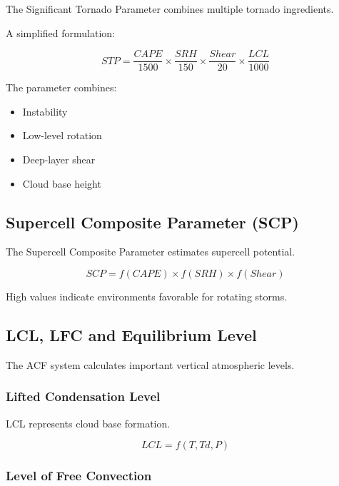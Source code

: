 The Significant Tornado Parameter combines multiple tornado ingredients.

A simplified formulation:

\[
STP=
\frac{CAPE}{1500}
\times
\frac{SRH}{150}
\times
\frac{Shear}{20}
\times
\frac{LCL}{1000}
\]

The parameter combines:

\begin{itemize}

\item Instability

\item Low-level rotation

\item Deep-layer shear

\item Cloud base height

\end{itemize}


\subsection{Supercell Composite Parameter (SCP)}

The Supercell Composite Parameter estimates supercell potential.

\[
SCP=
f(CAPE)
\times
f(SRH)
\times
f(Shear)
\]

High values indicate environments favorable for rotating storms.


\subsection{LCL, LFC and Equilibrium Level}

The ACF system calculates important vertical atmospheric levels.

\subsubsection{Lifted Condensation Level}

LCL represents cloud base formation.

\[
LCL=f(T,Td,P)
\]


\subsubsection{Level of Free Convection}


